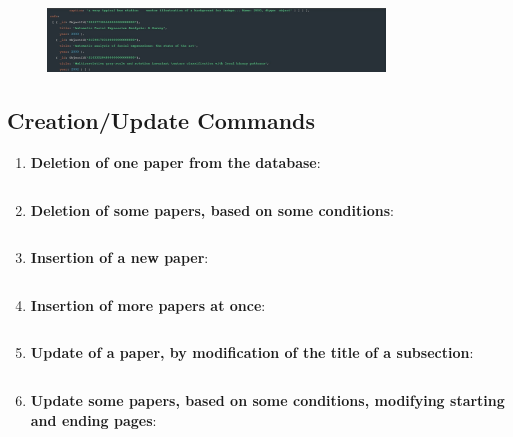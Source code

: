 \documentclass{Configuration_Files/PoliMi3i_thesis}
\begin{document}
\begin{enumerate}
\begin{figure}[H]
        \includegraphics[width=0.8\textwidth]{Images/queries_mongodb/query_11_5.jpg}
    \end{figure}
    
\end{enumerate}

\subsection{Creation/Update Commands}
\begin{enumerate}
    \item \textbf{Deletion of one paper from the database}:
    \inputminted[linenos,tabsize=2,breaklines]{MQL}{code/commands_mongodb/cmd_1.txt}
    \item \textbf{Deletion of some papers, based on some conditions}:
    \inputminted[linenos,tabsize=2,breaklines]{MQL}{code/commands_mongodb/cmd_2.txt}
    \item \textbf{Insertion of a new paper}:
    \inputminted[linenos,tabsize=2,breaklines]{MQL}{code/commands_mongodb/cmd_3.txt}
    \item \textbf{Insertion of more papers at once}:
    \inputminted[linenos,tabsize=2,breaklines]{MQL}{code/commands_mongodb/cmd_4.txt}
    \item \textbf{Update of a paper, by modification of the title of a subsection}:
    \inputminted[linenos,tabsize=2,breaklines]{MQL}{code/commands_mongodb/cmd_5.txt}
    \item \textbf{Update some papers, based on some conditions, modifying starting and ending pages}:
    \inputminted[linenos,tabsize=2,breaklines]{MQL}{code/commands_mongodb/cmd_6.txt}
\end{enumerate}
\end{document}
